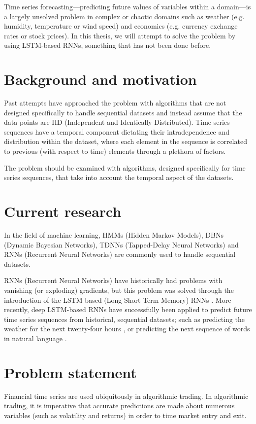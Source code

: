 Time series forecasting---predicting future values of variables within a domain---is a largely unsolved problem in complex or chaotic domains such as weather (e.g. humidity, temperature or wind speed) and economics (e.g. currency exchange rates or stock prices). In this thesis, we will attempt to solve the problem by using LSTM-based RNNs, something that has not been done before.

\section{Background and motivation}
Past attempts have approached the problem with algorithms that are not designed specifically to handle sequential datasets and instead assume that the data points are IID (Independent and Identically Distributed). Time series sequences have a temporal component dictating their intradependence and distribution within the dataset, where each element in the sequence is correlated to previous (with respect to time) elements through a plethora of factors.

The problem should be examined with algorithms, designed specifically for time series sequences, that take into account the temporal aspect of the datasets.

\section{Current research}
In the field of machine learning, HMMs (Hidden Markov Models), DBNs (Dynamic Bayesian Networks), TDNNs (Tapped-Delay Neural Networks) and RNNs (Recurrent Neural Networks) are commonly used to handle sequential datasets.

RNNs (Recurrent Neural Networks) have historically had problems with vanishing (or exploding) gradients, but this problem was solved through the introduction of the LSTM-based (Long Short-Term Memory) RNNs \citep*{hochreiter1997}. More recently, deep LSTM-based RNNs have successfully been applied to predict future time series sequences from historical, sequential datasets; such as predicting the weather for the next twenty-four hours \citep*{zaytar2016}, or predicting the next sequence of words in natural language \citep*{quoc2014}.

\section{Problem statement}
Financial time series are used ubiquitously in algorithmic trading. In algorithmic trading, it is imperative that accurate predictions are made about numerous variables (such as volatility and returns) in order to time market entry and exit.

